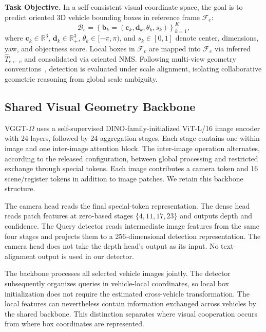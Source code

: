 \textbf{Task Objective.} In a self-consistent visual coordinate space, the goal is to predict oriented 3D vehicle bounding boxes in reference frame $\mathcal{F}_e$:
\begin{equation}
\mathcal{B}_e = \left\{ \mathbf{b}_k = \left(\mathbf{c}_k, \mathbf{d}_k, \theta_k, s_k\right) \right\}_{k=1}^K,
\end{equation}
where $\mathbf{c}_k \in \mathbb{R}^3$, $\mathbf{d}_k \in \mathbb{R}_+^3$, $\theta_k \in [-\pi, \pi)$, and $s_k \in [0, 1]$ denote center, dimensions, yaw, and objectness score. Local boxes in $\mathcal{F}_v$ are mapped into $\mathcal{F}_e$ via inferred $\hat{T}_{e \leftarrow v}$ and consolidated via oriented NMS. Following multi-view geometry conventions~\cite{dust3r,vggt}, detection is evaluated under scale alignment, isolating collaborative geometric reasoning from global scale ambiguity.

\subsection{Shared Visual Geometry Backbone}
VGGT-$\Omega$ uses a self-supervised DINO-family-initialized ViT-L/16 image encoder with 24 layers, followed by 24 aggregation stages. Each stage contains one within-image and one inter-image attention block. The inter-image operation alternates, according to the released configuration, between global processing and restricted exchange through special tokens. Each image contributes a camera token and 16 scene/register tokens in addition to image patches. We retain this backbone structure.

The camera head reads the final special-token representation. The dense head reads patch features at zero-based stages $\{4,11,17,23\}$ and outputs depth and confidence. The Query detector reads intermediate image features from the same four stages and projects them to a 256-dimensional detection representation. The camera head does not take the depth head's output as its input. No text-alignment output is used in our detector.

The backbone processes all selected vehicle images jointly. The detector subsequently organizes queries in vehicle-local coordinates, so local box initialization does not require the estimated cross-vehicle transformation. The local features can nevertheless contain information exchanged across vehicles by the shared backbone. This distinction separates where visual cooperation occurs from where box coordinates are represented.

